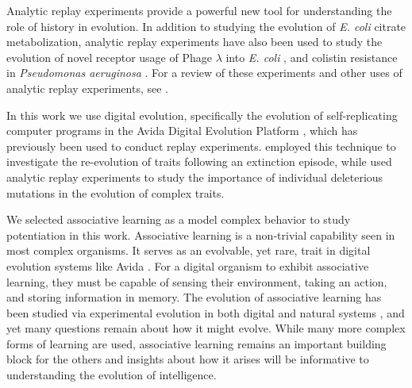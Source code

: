 Analytic replay experiments provide a powerful new tool for understanding the role of history in evolution. 
In addition to studying the evolution of \textit{E. coli} citrate metabolization, analytic replay experiments have also been used to study the evolution of novel receptor usage of Phage $\lambda$ into \textit{E. coli} \citep{meyerRepeatabilityContingencyEvolution2012}, and colistin resistance in \textit{Pseudomonas aeruginosa} \citep{jochumsenEvolutionAntimicrobialPeptide2016a}.
For a review of these experiments and other uses of analytic replay experiments, see \citep{blountContingencyDeterminismEvolution2018}.

In this work we use digital evolution, specifically the evolution of self-replicating computer programs in the Avida Digital Evolution Platform \citep{ofriaAvidaSoftwarePlatform2004a}, which has previously been used to conduct replay experiments.
\citet{yedidHistoricalContingentFactors2008} employed this technique to investigate the re-evolution of traits following an extinction episode, while  
\citet{covertiiiExperimentsRoleDeleterious2013} used analytic replay experiments to study the importance of individual deleterious mutations in the evolution of complex traits.

We selected associative learning as a model complex behavior to study potentiation in this work.
Associative learning is a non-trivial capability seen in most complex organisms.
It serves as an evolvable, yet rare, trait in digital evolution systems like Avida \citep{pontesEvolutionaryOriginAssociative2020}.
For a digital organism to exhibit associative learning, they must be capable of sensing their environment, taking an action, and storing information in memory. 
The evolution of associative learning has been studied via experimental evolution in both digital \citep{pontesEvolutionaryOriginAssociative2020, mcgregorEvolutionAssociativeLearning2012} and natural systems \citep{dunlapExperimentalEvolutionPrepared2014a, meryExperimentalEvolutionLearning2002}, and yet many questions remain about how it might evolve.
While many more complex forms of learning are used, associative learning remains an important building block for the others and insights about how it arises will be informative to understanding the evolution of intelligence.

